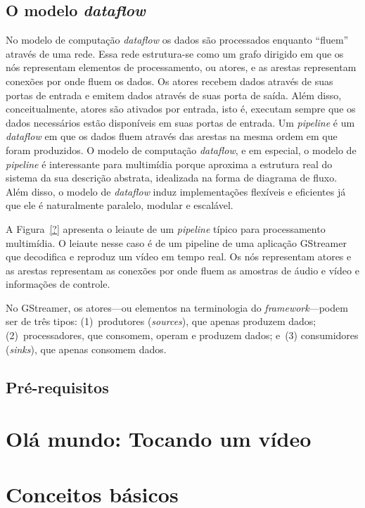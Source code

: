 \documentclass{SBCbookchapter}
\begin{document}

\subsection*{O modelo \emph{dataflow}}

No modelo de computação \emph{dataflow} os dados são processados enquanto
``fluem'' através de uma rede.  Essa rede estrutura-se como um grafo
dirigido em que os nós representam elementos de processamento, ou atores, e
as arestas representam conexões por onde fluem os dados.  Os atores recebem
dados através de suas portas de entrada e emitem dados através de suas porta
de saída.  Além disso, conceitualmente, atores são ativados por entrada,
isto é, executam sempre que os dados necessários estão disponíveis em suas
portas de entrada.  Um \emph{pipeline} é um \emph{dataflow} em que os dados
fluem através das arestas na mesma ordem em que foram produzidos.  O modelo
de computação \emph{dataflow}, e em especial, o modelo de \emph{pipeline} é
interessante para multimídia porque aproxima a estrutura real do sistema da
sua descrição abstrata, idealizada na forma de diagrama de fluxo.  Além
disso, o modelo de \emph{dataflow} induz implementações flexíveis e
eficientes já que ele é naturalmente paralelo, modular e escalável.

A Figura~\ref{?} apresenta o leiaute de um \emph{pipeline} típico para
processamento multimídia.  O leiaute nesse caso é de um pipeline de uma
aplicação GStreamer que decodifica e reproduz um vídeo em tempo real.  Os
nós representam atores e as arestas representam as conexões por onde fluem
as amostras de áudio e vídeo e informações de controle.

No GStreamer, os atores---ou elementos na terminologia do
\emph{framework}---podem ser de três tipos:  (1)~produtores
(\emph{sources}), que apenas produzem dados; (2)~processadores, que
consomem, operam e produzem dados; e~(3) consumidores (\emph{sinks}), que
apenas consomem dados.


\subsection*{Pré-requisitos}


\section{Olá mundo: Tocando um vídeo}
\label{sec:ola}


\section{Conceitos básicos}
\label{sec:conceitos}
\end{document}
